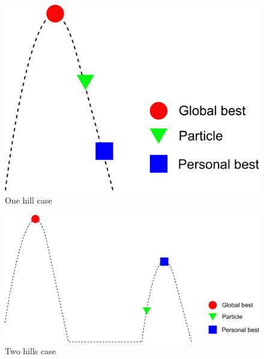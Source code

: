 \documentclass[10pt,a4paper]{article}
\begin{document}
\begin{figure}[h]
\centering
\includegraphics[width=0.5\linewidth]{./one_hill_case}
\caption{One hill case}
\label{fig:one_hill_case}
\end{figure}

\begin{figure}[h]
\centering
\includegraphics[width=0.9\linewidth]{./two_hills_case}
\caption{Two hills case}
\label{fig:two_hills_case}
\end{figure}
\end{document}
